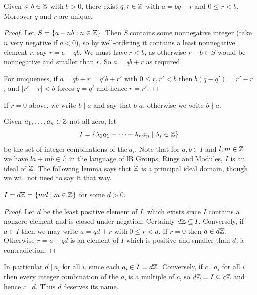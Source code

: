 \documentclass[a4paper]{scrartcl}
\begin{document}
\begin{theorem}
	Given $a, b \in \mathbb{Z}$ with $b > 0$, there exist $q, r \in \mathbb{Z}$ with $a = bq + r$ and $0 \leq r < b$. Moreover $q$ and $r$ are unique.
\end{theorem}
\begin{proof}
	Let $S = \{a - nb : n \in \mathbb{Z}\}$. Then $S$ contains some nonnegative integer (take $n$ very negative if $a < 0$), so by well-ordering it contains a least nonnegative element $r$, say $r = a - qb$. We must have $r < b$, as otherwise $r - b \in S$ would be nonnegative and smaller than $r$. So $a = qb + r$ as required.

	For uniqueness, if $a = qb + r = q'b + r'$ with $0 \leq r, r' < b$ then $b(q - q') = r' - r$, and $|r' - r| < b$ forces $q = q'$ and hence $r = r'$.
\end{proof}

\begin{definition}
	If $r = 0$ above, we write $b \mid a$ and say that $b$  $a$; otherwise we write $b \nmid a$.
\end{definition}

Given $a_1, \dots, a_n \in \mathbb{Z}$ not all zero, let
$$
I = \{\lambda_1 a_1 + \cdots + \lambda_n a_n \mid \lambda_i \in \mathbb{Z}\}
$$
be the set of integer combinations of the $a_i$. Note that for $a, b \in I$ and $l, m \in \mathbb{Z}$ we have $la + mb \in I$; in the language of IB Groups, Rings and Modules, $I$ is an ideal of $\mathbb{Z}$. The following lemma says that $\mathbb{Z}$ is a principal ideal domain, though we will not need to say it that way.

\begin{lemma}\label{lem:ideal}
	$I = d\mathbb{Z} = \{md \mid m \in \mathbb{Z}\}$ for some $d > 0$.
\end{lemma}
\begin{proof}
	Let $d$ be the least positive element of $I$, which exists since $I$ contains a nonzero element and is closed under negation. Certainly $d\mathbb{Z} \subseteq I$. Conversely, if $a \in I$ then we may write $a = qd + r$ with $0 \leq r < d$. If $r = 0$ then $a \in d\mathbb{Z}$. Otherwise $r = a - qd$ is an element of $I$ which is positive and smaller than $d$, a contradiction.
\end{proof}

In particular $d \mid a_i$ for all $i$, since each $a_i \in I = d\mathbb{Z}$. Conversely, if $c \mid a_i$ for all $i$ then every integer combination of the $a_i$ is a multiple of $c$, so $d\mathbb{Z} = I \subseteq c\mathbb{Z}$ and hence $c \mid d$. Thus $d$ deserves its name.
\end{document}
